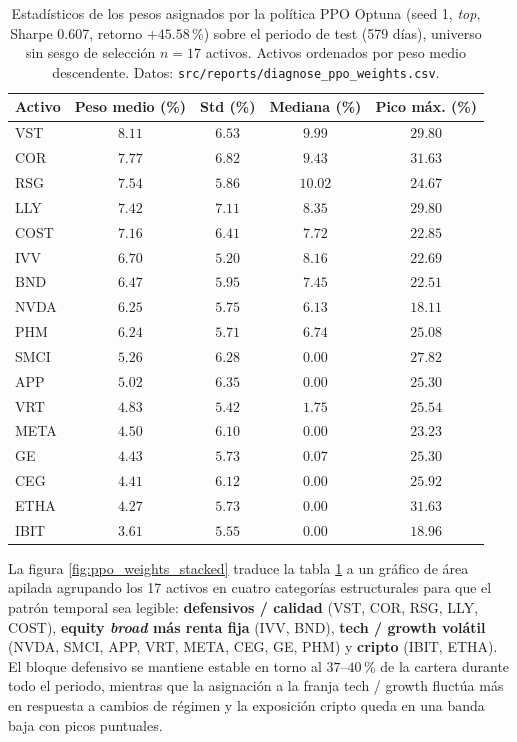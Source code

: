 \documentclass[IB,a4paper]{TFUOC}
\begin{document}
\begin{table}[h]
\centering
\renewcommand{\arraystretch}{1.20}
\begin{tabular}{|l|c|c|c|c|}
\hline
\textbf{Activo} & \textbf{Peso medio (\%)} & \textbf{Std (\%)} & \textbf{Mediana (\%)} & \textbf{Pico máx. (\%)} \\ \hline
VST   & $8.11$ & $6.53$ & $9.99$  & $29.80$ \\ \hline
COR   & $7.77$ & $6.82$ & $9.43$  & $31.63$ \\ \hline
RSG   & $7.54$ & $5.86$ & $10.02$ & $24.67$ \\ \hline
LLY   & $7.42$ & $7.11$ & $8.35$  & $29.80$ \\ \hline
COST  & $7.16$ & $6.41$ & $7.72$  & $22.85$ \\ \hline
IVV   & $6.70$ & $5.20$ & $8.16$  & $22.69$ \\ \hline
BND   & $6.47$ & $5.95$ & $7.45$  & $22.51$ \\ \hline
NVDA  & $6.25$ & $5.75$ & $6.13$  & $18.11$ \\ \hline
PHM   & $6.24$ & $5.71$ & $6.74$  & $25.08$ \\ \hline
SMCI  & $5.26$ & $6.28$ & $0.00$  & $27.82$ \\ \hline
APP   & $5.02$ & $6.35$ & $0.00$  & $25.30$ \\ \hline
VRT   & $4.83$ & $5.42$ & $1.75$  & $25.54$ \\ \hline
META  & $4.50$ & $6.10$ & $0.00$  & $23.23$ \\ \hline
GE    & $4.43$ & $5.73$ & $0.07$  & $25.30$ \\ \hline
CEG   & $4.41$ & $6.12$ & $0.00$  & $25.92$ \\ \hline
ETHA  & $4.27$ & $5.73$ & $0.00$  & $31.63$ \\ \hline
IBIT  & $3.61$ & $5.55$ & $0.00$  & $18.96$ \\ \hline
\end{tabular}
\caption[Estadísticos de los pesos asignados por la política PPO Optuna (seed 1).]{Estadísticos de los pesos asignados por la política PPO Optuna (seed 1, \textit{top}, Sharpe 0.607, retorno $+45.58$\,\%) sobre el periodo de test (579 días), universo sin sesgo de selección $n=17$ activos. Activos ordenados por peso medio descendente. Datos: \texttt{src/reports/diagnose\_ppo\_weights.csv}.}
\label{tab:pesos_ppo}
\end{table}

La figura \ref{fig:ppo_weights_stacked} traduce la tabla \ref{tab:pesos_ppo} a un gráfico de área apilada agrupando los 17 activos en cuatro categorías estructurales para que el patrón temporal sea legible: \textbf{defensivos / calidad} (VST, COR, RSG, LLY, COST), \textbf{equity \textit{broad} más renta fija} (IVV, BND), \textbf{tech / growth volátil} (NVDA, SMCI, APP, VRT, META, CEG, GE, PHM) y \textbf{cripto} (IBIT, ETHA). El bloque defensivo se mantiene estable en torno al $37$--$40$\,\% de la cartera durante todo el periodo, mientras que la asignación a la franja tech / growth fluctúa más en respuesta a cambios de régimen y la exposición cripto queda en una banda baja con picos puntuales.
\end{document}
